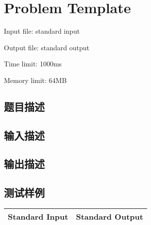 \newpage
\section{Problem Template}
{ \limitfont{}
Input file: standard input \par
Output file: standard output \par
Time limit: 1000ms \par
Memory limit: 64MB \par
}
\subsection*{题目描述}

\subsection*{输入描述}

\subsection*{输出描述}

\subsection*{测试样例}

\begin{table}[H]
\begin{tabularx}{\textwidth}{|X|X|}
    \hline
    \textbf{Standard Input} & \textbf{Standard Output} \\ 
    \hline
\end{tabularx}
\end{table}